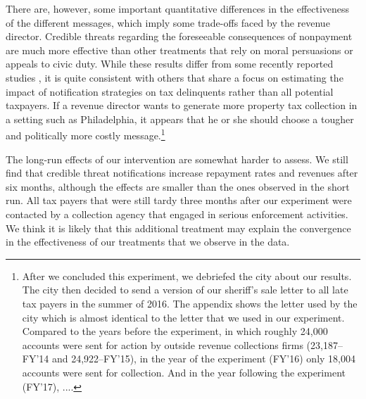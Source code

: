 \documentclass[12pt]{article}
\begin{document}
There are, however, some important quantitative differences in the
effectiveness of the different messages, which imply some trade-offs
faced by the revenue director. Credible threats regarding the
foreseeable consequences of nonpayment are much more effective than
other treatments that rely on moral persuasions or appeals to civic
duty. While these results differ from some recently reported studies
\cite{delcarpio,Hallsworth-14}, it is quite consistent with others 
that share a focus on estimating the impact of notification strategies
on tax delinquents rather than all potential taxpayers\cite{castro,Hallsworthb-14}.
If a revenue director wants to generate more property tax
collection in a setting such as Philadelphia, it appears that he or she should choose a
tougher and politically more costly message.\footnote{After we concluded this experiment, 
we debriefed the city about our results. The city then decided to send a version of our
sheriff's sale letter to all late tax payers in the summer of
2016. The appendix shows the letter used by the city which is 
almost identical to the letter that we used in our experiment.
Compared to the years before the experiment, in which roughly 24,000 accounts
were sent for action by outside revenue collections firms (23,187--FY'14 and 24,922--FY'15), in the year of the experiment (FY'16) only 18,004 accounts were sent
for collection. And in the year following the experiment (FY'17), ....}

The long-run effects of our intervention are somewhat harder to assess.  We
still find that credible threat notifications increase repayment rates
and revenues after six months, although the effects are smaller than
the ones observed in the short run.  All tax payers that were still
tardy three months after our experiment were contacted by a collection
agency that engaged in serious enforcement activities. We think it is
likely that this additional treatment may explain the convergence in
the effectiveness of our treatments that we observe in the data.
\end{document}
